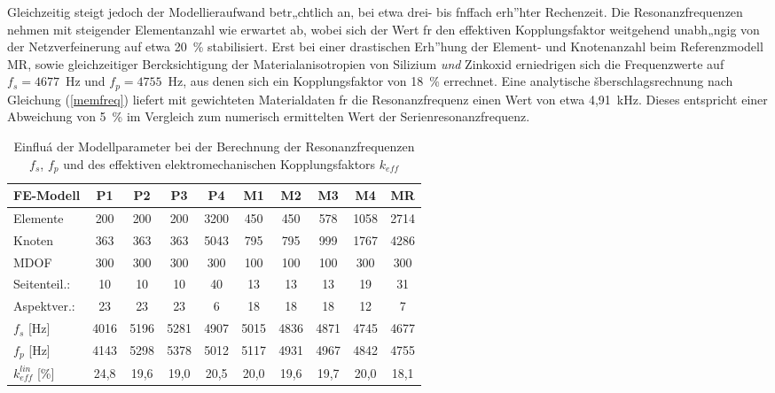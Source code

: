 Gleichzeitig steigt jedoch der Modellieraufwand betr„chtlich an, bei
etwa drei- bis fnffach erh”hter Rechenzeit. Die Resonanzfrequenzen nehmen
mit steigender Elementanzahl wie erwartet ab, wobei sich der Wert fr den
effektiven Kopplungsfaktor weitgehend unabh„ngig von der Netzverfeinerung
auf etwa 20~\% stabilisiert. Erst bei einer drastischen Erh”hung der
Element- und Knotenanzahl beim Referenzmodell MR, sowie gleichzeitiger
Bercksichtigung der Materialanisotropien von Silizium {\em und} Zinkoxid
erniedrigen sich die Frequenzwerte auf $f_{s} = 4677$~Hz und
$f_{p} = 4755$~Hz, aus denen sich ein Kopplungsfaktor von 18~\% errechnet.
Eine analytische šberschlagsrechnung nach Gleichung (\ref{memfreq}) liefert
mit gewichteten Materialdaten fr die Resonanzfrequenz einen Wert von etwa
4,91~kHz. Dieses entspricht einer Abweichung von 5~\% im Vergleich zum
numerisch ermittelten Wert der Serienresonanzfrequenz. \\
\begin{table}[htb]
\caption{\label{tabmodellparamkeff}
 Einfluá der Modellparameter bei der Berechnung der Resonanzfrequenzen
 $f_{s}$, $f_{p}$ und des effektiven elektromechanischen
 Kopplungsfaktors $k_{eff}$}
\begin{center}
\begin{tabular} {|l||c|c|c|c||c|c|c|c||c|}
\hline
 FE-Modell & P1 & P2 & P3 & P4 & M1 & M2 & M3 & M4 & MR \\
\hline \hline
 Elemente  & 200 & 200 & 200 & 3200 & 450 & 450 & 578 & 1058 & 2714 \\
 Knoten    & 363 & 363 & 363 & 5043 & 795 & 795 & 999 & 1767 & 4286 \\
 MDOF      & 300 & 300 & 300 & 300  & 100 & 100 & 100 & 300  & 300 \\
\hline
 Seitenteil.: & 10 & 10 & 10 & 40 & 13 & 13 & 13 & 19 & 31 \\
 Aspektver.:  & 23 & 23 & 23 & 6  & 18 & 18 & 18 & 12 & 7  \\
\hline \hline
 $f_{s}$ [Hz] & 4016 & 5196 & 5281 & 4907 & 5015 & 4836 & 4871 & 4745 & 4677 \\
 $f_{p}$ [Hz] & 4143 & 5298 & 5378 & 5012 & 5117 & 4931 & 4967 & 4842 & 4755 \\
\hline
 $k^{lin}_{eff}$ [\%]
 & 24,8 & 19,6 & 19,0 & 20,5 & 20,0 & 19,6 & 19,7 & 20,0 & 18,1 \\
\hline
\end{tabular}\\
\end{center}
\end{table}
